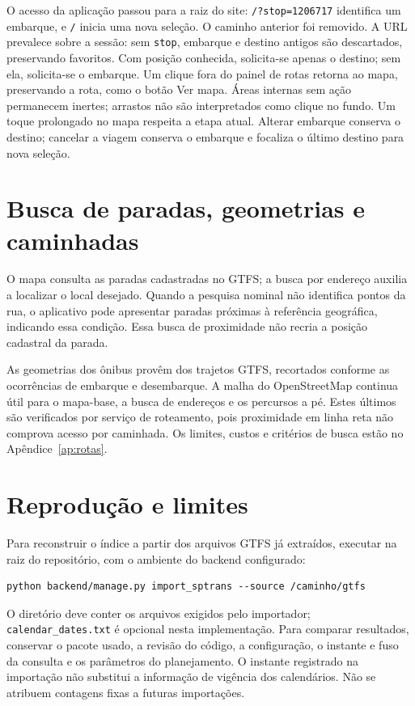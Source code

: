 \documentclass[12pt,oneside,a4paper,brazil,chapter=TITLE]{abntex2}
\let\papsection\section
\renewcommand{\section}{\clearpage\papsection}
\begin{document}
\begin{apendicesenv}
O acesso da aplicação passou para a raiz do site: \texttt{/?stop=1206717} identifica um embarque, e \texttt{/} inicia uma nova seleção. O caminho anterior foi removido. A URL prevalece sobre a sessão: sem \texttt{stop}, embarque e destino antigos são descartados, preservando favoritos. Com posição conhecida, solicita-se apenas o destino; sem ela, solicita-se o embarque. Um clique fora do painel de rotas retorna ao mapa, preservando a rota, como o botão Ver mapa. Áreas internas sem ação permanecem inertes; arrastos não são interpretados como clique no fundo. Um toque prolongado no mapa respeita a etapa atual. Alterar embarque conserva o destino; cancelar a viagem conserva o embarque e focaliza o último destino para nova seleção.


\section{Busca de paradas, geometrias e caminhadas}
O mapa consulta as paradas cadastradas no GTFS; a busca por endereço auxilia a localizar o local desejado. Quando a pesquisa nominal não identifica pontos da rua, o aplicativo pode apresentar paradas próximas à referência geográfica, indicando essa condição. Essa busca de proximidade não recria a posição cadastral da parada.

As geometrias dos ônibus provêm dos trajetos GTFS, recortados conforme as ocorrências de embarque e desembarque. A malha do OpenStreetMap continua útil para o mapa-base, a busca de endereços e os percursos a pé. Estes últimos são verificados por serviço de roteamento, pois proximidade em linha reta não comprova acesso por caminhada. Os limites, custos e critérios de busca estão no Apêndice~\ref{ap:rotas}.

\section{Reprodução e limites}
Para reconstruir o índice a partir dos arquivos GTFS já extraídos, executar na raiz do repositório, com o ambiente do backend configurado:
\begin{verbatim}
python backend/manage.py import_sptrans --source /caminho/gtfs
\end{verbatim}
O diretório deve conter os arquivos exigidos pelo importador; \texttt{calendar\_dates.txt} é opcional nesta implementação. Para comparar resultados, conservar o pacote usado, a revisão do código, a configuração, o instante e fuso da consulta e os parâmetros do planejamento. O instante registrado na importação não substitui a informação de vigência dos calendários. Não se atribuem contagens fixas a futuras importações.


\end{apendicesenv}
\end{document}
